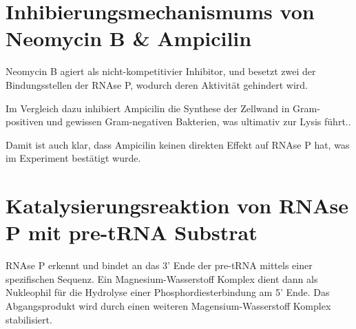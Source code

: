 \documentclass[a4paper,english]{scrreprt}
\begin{document}
\section{Inhibierungsmechanismums von Neomycin B \& Ampicilin}

Neomycin B agiert als nicht-kompetitivier Inhibitor, und besetzt zwei der
 Bindungsstellen der RNAse P, wodurch deren Aktivität gehindert
wird.\cite{skriptv1}

Im Vergleich dazu inhibiert Ampicilin die Synthese der Zellwand in
Gram-positiven und gewissen Gram-negativen Bakterien, was ultimativ zur Lysis
führt.\cite{website:pubchem_ampicilin}.

Damit ist auch klar, dass Ampicilin keinen direkten Effekt auf RNAse P hat, was
im Experiment bestätigt wurde.

\section{Katalysierungsreaktion von RNAse P mit pre-tRNA Substrat}


RNAse P erkennt und bindet an das 3' Ende der pre-tRNA mittels einer
spezifischen Sequenz. Ein Magnesium-Wasserstoff Komplex dient dann als
Nukleophil für die Hydrolyse einer Phosphordiesterbindung am 5' Ende. Das
Abgangsprodukt wird durch einen weiteren Magensium-Wasserstoff Komplex
stabilisiert.



\end{document}
